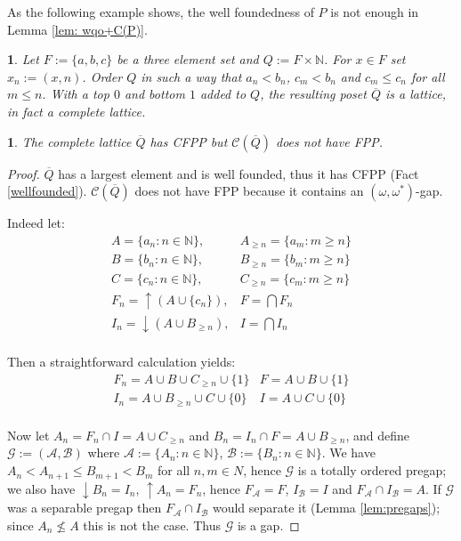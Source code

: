 \documentclass[12pt]{amsart}
\newtheorem{claim}[definition]{\noindent {\bf Claim}}
\newtheorem{example}[definition]{\noindent {\bf Example}}
\begin{document}
\vspace{.3cm}

As the following example shows, the well foundedness of $P$ is not enough in Lemma \ref{lem: wqo+C(P)}. 

\begin{example}\label{examplenotFPP} 
Let $F:= \{a,b,c\}$ be a three element set and $Q:= F\times {\mathbb{N}}$.  For
$x\in F$ set $x_n:= (x, n)$. Order $Q$ in such a way that $a_n<b_n$,
$c_m<b_n$ and $c_m\leq c_n$ for all $m\leq n$. With a top $0$ and
bottom $1$ added to $Q$, the resulting poset $\overline Q$ is a
lattice, in fact a complete lattice.  
\end{example}
 
\begin{claim}\label{lem:nofixedpoint}
The complete lattice $\overline Q$ has CFPP but $\mathcal
C (\overline Q)$ does not have FPP.
\end{claim}

\begin{proof}
$\overline Q$ has a largest element and is well founded, thus it has
CFPP (Fact \ref{wellfounded}).  $\mathcal C (\overline Q)$ does not
have FPP because it contains an $(\omega, \omega^*)$-gap. 

Indeed let:
\[\begin{array}{ll}
A=\{a_n : n \in {\mathbb{N}}\}, & A_{\geq n} = \{ a_m: m \geq n\} \\
B=\{b_n : n \in {\mathbb{N}}\}, & B_{\geq n} = \{ b_m: m \geq n\} \\
C=\{c_n : n \in {\mathbb{N}}\}, & C_{\geq n} = \{ c_m: m \geq n\} \\
F_n = {\uparrow \!\!} (A \cup \{c_n\}), & F= \bigcap F_n \\
I_n = {\downarrow \!\!} (A \cup B_{\geq n}), & I= \bigcap I_n \\
\end{array}\]

Then a straightforward calculation yields: 
\[\begin{array}{ll}
F_n = A \cup B \cup C_{\geq n} \cup \{1\}  & F = A \cup B \cup \{1\} \\
I_n = A \cup B_{\geq n} \cup C  \cup \{0\}  & I = A \cup C \cup \{0\} \\
\end{array}\]

Now let $A_n=F_n\cap I = A \cup C_{\geq n}$ and $B_n=I_n\cap F = A
\cup B_{\geq n}$, and define $\mathcal G:=(\mathcal A, \mathcal B)$
where $\mathcal A:= \{A_n : n\in{\mathbb{N}}\}$, $\mathcal B:= \{B_n: n\in{\mathbb{N}}\}$.
We have $A_n<A_{n+1}\leq B_{m+1}<B_m$ for all $n, m\in N$, hence
$\mathcal G$ is a totally ordered pregap; we also have
${\downarrow \!\!} B_n=I_n$, ${\uparrow \!\!} A_n=F_n$, hence $F_{\mathcal
A}=F$, $I_{\mathcal B}= I$ and $F_{\mathcal A}\cap I_{\mathcal B}=A$.
If $\mathcal G$ was a separable pregap then $F_{\mathcal A}\cap
I_{\mathcal B}$ would separate it (Lemma \ref{lem:pregaps}); since
$A_n \not\leq A$ this is not the case. Thus $\mathcal G$ is a gap.

\end{proof}
 
\end{document}
